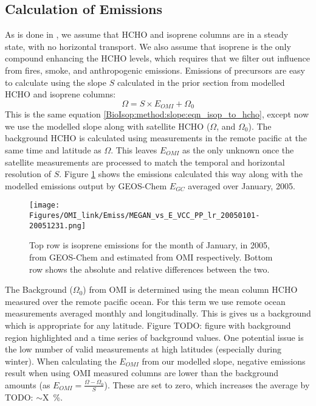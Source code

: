     
  \subsection{Calculation of Emissions}
    \label{BioIsop:method:calculation}
   
    As is done in \textcite{Palmer2003, Millet2006, Bauwens2016}, we assume that HCHO and isoprene columns are in a steady state, with no horizontal transport.
    We also assume that isoprene is the only compound enhancing the HCHO levels, which requires that we filter out influence from fires, smoke, and anthropogenic emissions.
    Emissions of precursors are easy to calculate using the slope $S$ calculated in the prior section from modelled HCHO and isoprene columns:
    \begin{equation*}
    \Omega = S \times E_{OMI} + \Omega_0
    \end{equation*}
    This is the same equation \ref{BioIsop:method:slope:eqn_isop_to_hcho}, except now we use the modelled slope along with satellite HCHO ($\Omega$, and $\Omega_0$).
    The background HCHO is calculated using measurements in the remote pacific at the same time and latitude as $\Omega$.
    This leaves $E_{OMI}$ as the only unknown once the satellite measurements are processed to match the temporal and horizontal resolution of $S$.
    Figure \ref{BioIsop:method:calculation:fig_E_isop_200501} shows the emissions calculated this way along with the modelled emissions output by GEOS-Chem $E_{GC}$ averaged over January, 2005.
    
    \begin{figure}
      \texttt{[image: Figures/OMI\_link/Emiss/MEGAN\_vs\_E\_VCC\_PP\_lr\_20050101-20051231.png]}
      \caption{%
        Top row is isoprene emissions for the month of January, in 2005, from GEOS-Chem and estimated from OMI respectively.
        Bottom row shows the absolute and relative differences between the two.
      }
      \label{BioIsop:method:calculation:fig_E_isop_200501}
    \end{figure}
    
    The Background ($\Omega_0$) from OMI is determined using the mean column HCHO measured over the remote pacific ocean.
    For this term we use remote ocean measurements averaged monthly and longitudinally.
    This is gives us a background which is appropriate for any latitude.
    Figure TODO: figure with background region highlighted and a time series of background values.
    One potential issue is the low number of valid measurements at high latitudes (especially during winter).
    When calculating the $E_{OMI}$ from our modelled slope, negative emissions result when using OMI measured columns are lower than the background amounts (as $E_{OMI} = \frac{\Omega - \Omega_0}{S}$).
    These are set to zero, which increases the average by TODO: $\sim$X~\%.
    
